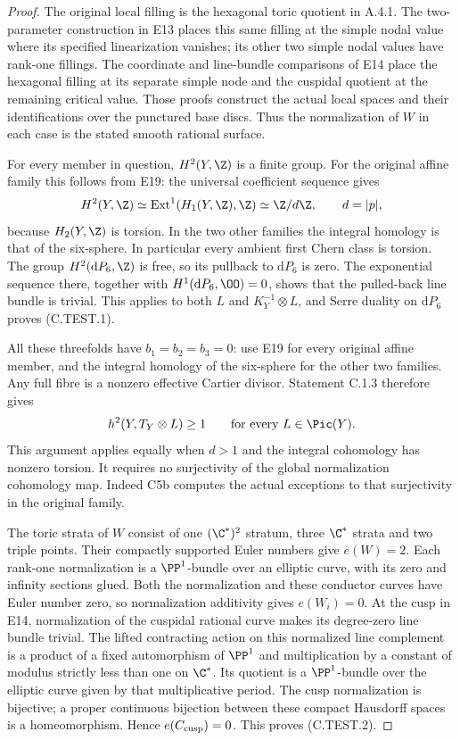 \begin{proof}
The original local filling is the hexagonal toric quotient
in A.4.1. The two-parameter construction in E13 places this
same filling at the simple nodal value where its specified
linearization vanishes; its other two simple nodal values
have rank-one fillings. The coordinate and line-bundle
comparisons of E14 place the hexagonal filling at its
separate simple node and the cuspidal quotient at the
remaining critical value. Those proofs construct the actual
local spaces and their identifications over the punctured
base discs. Thus the normalization of $W$ in each case is
the stated smooth rational surface.

For every member in question, $H^2(Y,\Z)$ is a finite
group. For the original affine family this follows from E19:
the universal coefficient sequence gives
\[
 H^2(Y,\Z)\simeq\operatorname{Ext}^1(H_1(Y,\Z),\Z)
 \simeq\Z/d\Z,\qquad d=|p|,
\]
because $H_2(Y,\Z)$ is torsion. In the two other families
the integral homology is that of the six-sphere. In
particular every ambient first Chern class is torsion.
The group $H^2(\mathrm dP_6,\Z)$ is free, so its pullback
to $\mathrm dP_6$ is zero. The exponential sequence there,
together with $H^1(\mathrm dP_6,\OO)=0$, shows that the
pulled-back line bundle is trivial. This applies to both
$L$ and $K_Y^{-1}\otimes L$, and Serre duality on
$\mathrm dP_6$ proves (C.TEST.1).

All these threefolds have $b_1=b_2=b_3=0$: use E19 for
every original affine member, and the integral homology
of the six-sphere for the other two families. Any full
fibre is a nonzero effective Cartier divisor. Statement
C.1.3 therefore gives
\[
 h^2(Y,T_Y\otimes L)\geq 1
 \qquad\text{for every }L\in\Pic(Y).
\]
This argument applies equally when $d>1$ and the integral
cohomology has nonzero torsion. It requires no surjectivity
of the global normalization cohomology map. Indeed C5b
computes the actual exceptions to that surjectivity in
the original family.

The toric strata of $W$ consist of one $(\C^*)^2$ stratum,
three $\C^*$ strata and two triple points. Their compactly
supported Euler numbers give $e(W)=2$.
Each rank-one normalization is a $\PP^1$-bundle over an
elliptic curve, with its zero and infinity sections glued.
Both the normalization and these conductor curves have
Euler number zero, so normalization additivity gives
$e(W_i)=0$. At the cusp in E14, normalization of the
cuspidal rational curve makes its degree-zero line bundle
trivial. The lifted contracting action on this normalized
line complement is a product of a fixed automorphism of
$\PP^1$ and multiplication by a constant of modulus
strictly less than one on $\C^*$. Its quotient is a
$\PP^1$-bundle over the elliptic curve given by that
multiplicative period. The cusp normalization is
bijective; a proper continuous bijection between these
compact Hausdorff spaces is a homeomorphism. Hence
$e(C_{\rm cusp})=0$. This proves (C.TEST.2).


\end{proof}
